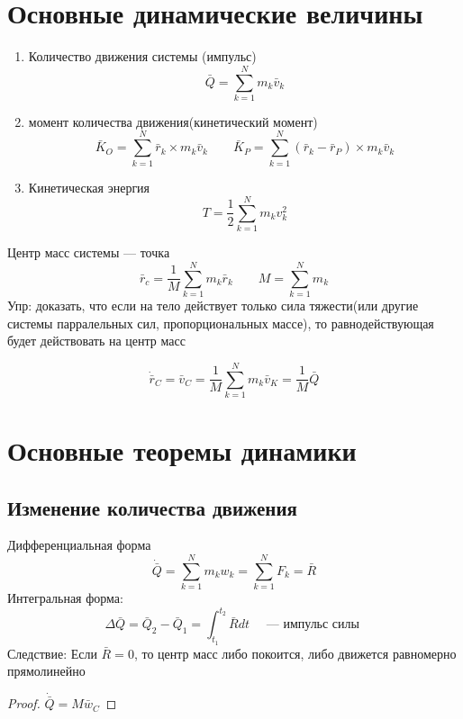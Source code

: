 \documentclass[crop=false]{standalone}
\begin{document}
\section{Основные динамические величины}
\begin{enumerate}
    \item Количество движения системы (импульс)
    \[\bar Q = \sum_{k=1}^{N} m_k \bar v_k\]
    
    \item момент количества движения(кинетический момент)
    \[\bar K_O = \sum_{k=1}^{N} \bar r_k \times m_k \bar v_k \qquad \bar K_P = \sum_{k=1}^{N} (\bar r_k - \bar r_P) \times m_k \bar v_k\]

    \item Кинетическая энергия
    \[T = \frac{1}{2} \sum_{k=1}^{N} m_k v_k^2\]
\end{enumerate}
\Def Центр масс системы — точка
\[\bar r_c = \frac{1}{M} \sum_{k=1}^{N} m_k \bar r_k \qquad M = \sum_{k=1}^{N} m_k\]
Упр: доказать, что если на тело действует только сила тяжести(или другие системы парралельных сил, пропорциональных массе), то равнодействующая будет действовать на центр масс

\noindent \keypoint
\[\dot{\bar r}_C = \bar v_C = \frac{1}{M} \sum_{k=1}^{N} m_k \bar v_K = \frac{1}{M} \bar Q\]


\section{Основные теоремы динамики}

\subsection{Изменение количества движения}
Дифференциальная форма
\[\dot{\bar Q} = \sum_{k=1}^{N} m_k w_k = \sum_{k=1}^N F_k = \bar R\]
Интегральная форма:
\[\Delta \bar Q = \bar Q_2 - \bar Q_1 = \int_{t_1}^{t_2} \bar R dt \quad \text{ — импульс силы }\]
Следствие: Если $\bar R = 0$, то центр масс либо покоится, либо движется равномерно прямолинейно
\begin{proof}
    $\dot {\bar Q} = M \bar w_C$
\end{proof}
\end{document}
